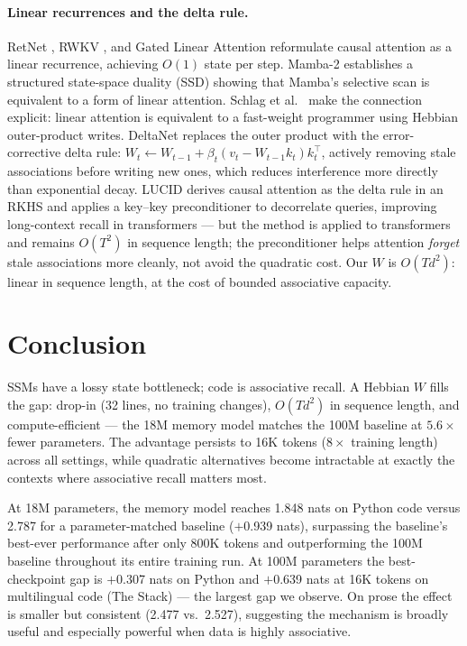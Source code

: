 \documentclass{article}
\begin{document}
\paragraph{Linear recurrences and the delta rule.}
RetNet \citep{sun2023retentive}, RWKV \citep{peng2023rwkv}, and Gated Linear Attention \citep{yang2023gated} reformulate causal attention as a linear recurrence, achieving $O(1)$ state per step. Mamba-2 \citep{dao2024mamba2} establishes a structured state-space duality (SSD) showing that Mamba's selective scan is equivalent to a form of linear attention. Schlag et al.~\citep{schlag2021linear} make the connection explicit: linear attention is equivalent to a fast-weight programmer using Hebbian outer-product writes. DeltaNet \citep{yang2024deltanet} replaces the outer product with the error-corrective delta rule: $W_t \leftarrow W_{t-1} + \beta_t(v_t - W_{t-1}k_t)k_t^\top$, actively removing stale associations before writing new ones, which reduces interference more directly than exponential decay. LUCID \citep{duvvuri2026lucid} derives causal attention as the delta rule in an RKHS and applies a key--key preconditioner to decorrelate queries, improving long-context recall in transformers --- but the method is applied to transformers and remains $O(T^2)$ in sequence length; the preconditioner helps attention \emph{forget} stale associations more cleanly, not avoid the quadratic cost. Our $W$ is $O(Td^2)$: linear in sequence length, at the cost of bounded associative capacity.

\section{Conclusion}

SSMs have a lossy state bottleneck; code is associative recall. A Hebbian $W$ fills the gap: drop-in (32 lines, no training changes), $O(Td^2)$ in sequence length, and compute-efficient --- the 18M memory model matches the 100M baseline at $5.6\times$ fewer parameters. The advantage persists to 16K tokens ($8\times$ training length) across all settings, while quadratic alternatives become intractable at exactly the contexts where associative recall matters most.

At 18M parameters, the memory model reaches 1.848 nats on Python code versus 2.787 for a parameter-matched baseline ($+$0.939 nats), surpassing the baseline's best-ever performance after only 800K tokens and outperforming the 100M baseline throughout its entire training run. At 100M parameters the best-checkpoint gap is $+$0.307 nats on Python and $+$0.639 nats at 16K tokens on multilingual code (The Stack) --- the largest gap we observe. On prose the effect is smaller but consistent (2.477 vs.\ 2.527), suggesting the mechanism is broadly useful and especially powerful when data is highly associative.
\end{document}
